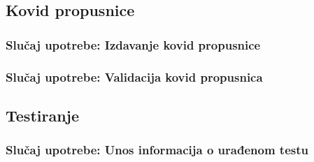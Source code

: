 \documentclass[titlepage]{article}
\begin{document}
\subsection{Kovid propusnice}

\subsubsection{Slučaj upotrebe: Izdavanje kovid propusnice}

\subsubsection{Slučaj upotrebe: Validacija kovid propusnica}

\subsection{Testiranje}

\subsubsection{Slučaj upotrebe: Unos informacija o urađenom testu}
\end{document}
